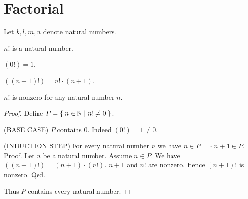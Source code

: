 \documentclass[../../arithmetic.ftl.tex]{subfiles}
\begin{document}
  \section{Factorial}

  \begin{forthel}
  \end{forthel}

  \begin{forthel}
    Let $k, l, m, n$ denote natural numbers.
  \end{forthel}

  \begin{forthel}
    \begin{signature}
      $n!$ is a natural number.
    \end{signature}

    \begin{axiom}\label{Arithmetic_01_05_169222}
      $(0!) = 1$.
    \end{axiom}

    \begin{axiom}\label{Arithmetic_01_05_539010}
      $((n + 1)!) = n! \cdot (n + 1)$.
    \end{axiom}


    \begin{proposition}\label{Arithmetic_01_05_473272}
      $n!$ is nonzero for any natural number $n$.
    \end{proposition}
    \begin{proof}
      Define $P = \Set{n \in \mathbb{N} | n! \neq 0}$.

      (BASE CASE) $P$ contains $0$.
      Indeed $(0!) = 1 \neq 0$.

      (INDUCTION STEP) For every natural number $n$ we have $n \in P \implies n + 1 \in P$. \\
      Proof.
        Let $n$ be a natural number.
        Assume $n \in P$.
        We have $((n + 1)!) = (n + 1) \cdot (n!)$.
        $n + 1$ and $n!$ are nonzero.
        Hence $(n + 1)!$ is nonzero.
      Qed.

      Thus $P$ contains every natural number.
    \end{proof}
  \end{forthel}
\end{document}

